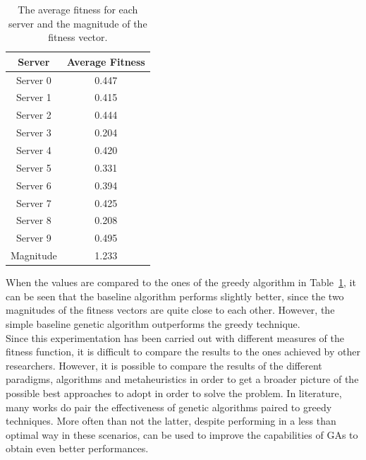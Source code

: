 \begin{table}[ht]
    \centering
    \begin{tabular}{|c|c|}
        \hline
        Server & Average Fitness \\
        \hline
        Server 0 & 0.447 \\
        Server 1 & 0.415 \\
        Server 2 & 0.444 \\
        Server 3 & 0.204 \\
        Server 4 & 0.420 \\
        Server 5 & 0.331 \\
        Server 6 & 0.394 \\
        Server 7 & 0.425 \\
        Server 8 & 0.208 \\
        Server 9 & 0.495 \\
        \hline
        Magnitude & 1.233 \\
        \hline
    \end{tabular}
    \caption{The average fitness for each server and the magnitude of the fitness vector.}
    \label{tab:average_greedy_fitness}
\end{table}

When the values are compared to the ones of the greedy algorithm in Table~\ref{tab:average_greedy_fitness}, it can be seen that the baseline algorithm
performs slightly better, since the two magnitudes of the fitness vectors are quite close to each other.
However, the simple baseline genetic algorithm outperforms the greedy technique.\\

Since this experimentation has been carried out with different measures of the fitness function, it is difficult to compare the results to the ones achieved
by other researchers. However, it is possible to compare the results of the different paradigms, algorithms and metaheuristics in order to get a broader picture of the
possible best approaches to adopt in order to solve the problem.
In literature, many works do pair the effectiveness of genetic algorithms paired to greedy techniques. More often than not the latter, despite performing in a less
than optimal way in these scenarios, can be used to improve the capabilities of GAs to obtain even better performances.~\cite{AHUJA2000917}

